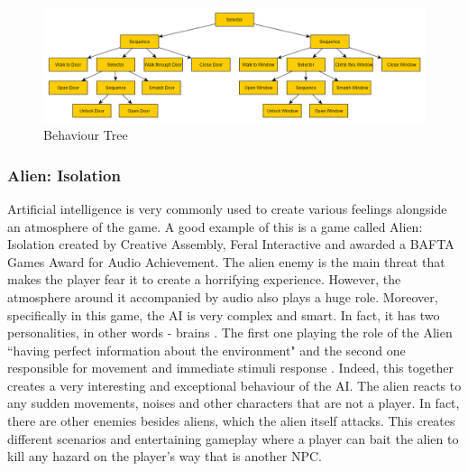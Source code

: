\documentclass[journal]{IEEEtran}
\begin{document}
\begin{figure}
	\includegraphics[width=\linewidth]{Images/BehaviourTree.PNG}
	\caption{Behaviour Tree \cite{chris2014}}
	\label{fig:bt}
\end{figure}

\subsubsection{Alien: Isolation} %
Artificial intelligence is very commonly used to create various feelings alongside an atmosphere of the game. A good example of this is a game called Alien: Isolation created by Creative Assembly, Feral Interactive and awarded a BAFTA Games Award for Audio Achievement. The alien enemy is the main threat that makes the player fear it to create a horrifying experience. However, the atmosphere around it accompanied by audio also plays a huge role. Moreover, specifically in this game, the AI is very complex and smart. In fact, it has two personalities, in other words - brains \cite{seller2019horrific}. The first one playing the role of the Alien ``having perfect information about the environment" \cite{seller2019horrific} and the second one responsible for movement and immediate stimuli response \cite{seller2019horrific}. Indeed, this together creates a very interesting and exceptional behaviour of the AI. The alien reacts to any sudden movements, noises and other characters that are not a player. In fact, there are other enemies besides aliens, which the alien itself attacks. This creates different scenarios and entertaining gameplay where a player can bait the alien to kill any hazard on the player's way that is another NPC.
\end{document}
